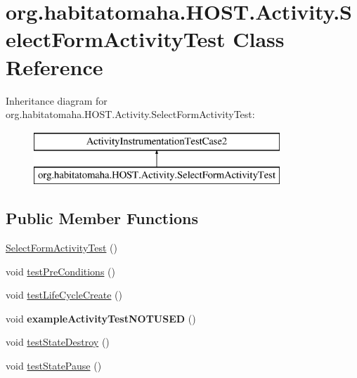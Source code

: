 \hypertarget{classorg_1_1habitatomaha_1_1_h_o_s_t_1_1_activity_1_1_select_form_activity_test}{\section{org.\-habitatomaha.\-H\-O\-S\-T.\-Activity.\-Select\-Form\-Activity\-Test Class Reference}
\label{classorg_1_1habitatomaha_1_1_h_o_s_t_1_1_activity_1_1_select_form_activity_test}
}
Inheritance diagram for org.\-habitatomaha.\-H\-O\-S\-T.\-Activity.\-Select\-Form\-Activity\-Test\-:\begin{figure}[H]
\begin{center}
\leavevmode
\includegraphics[height=2.000000cm]{classorg_1_1habitatomaha_1_1_h_o_s_t_1_1_activity_1_1_select_form_activity_test}
\end{center}
\end{figure}
\subsection*{Public Member Functions}
\begin{DoxyCompactItemize}
\item 
\hyperlink{classorg_1_1habitatomaha_1_1_h_o_s_t_1_1_activity_1_1_select_form_activity_test_a1c36d3926858cc7a01904e42834637f7}{Select\-Form\-Activity\-Test} ()
\item 
void \hyperlink{classorg_1_1habitatomaha_1_1_h_o_s_t_1_1_activity_1_1_select_form_activity_test_a754c487f825ff9eac17490d90c09cea4}{test\-Pre\-Conditions} ()
\item 
void \hyperlink{classorg_1_1habitatomaha_1_1_h_o_s_t_1_1_activity_1_1_select_form_activity_test_a7918c78326b5258573ebed55d110b2fb}{test\-Life\-Cycle\-Create} ()
\item 
\hypertarget{classorg_1_1habitatomaha_1_1_h_o_s_t_1_1_activity_1_1_select_form_activity_test_a513d12171fd97ac76bc5b6fdd797fb94}{void {\bfseries example\-Activity\-Test\-N\-O\-T\-U\-S\-E\-D} ()}\label{classorg_1_1habitatomaha_1_1_h_o_s_t_1_1_activity_1_1_select_form_activity_test_a513d12171fd97ac76bc5b6fdd797fb94}

\item 
void \hyperlink{classorg_1_1habitatomaha_1_1_h_o_s_t_1_1_activity_1_1_select_form_activity_test_ada1b61c2f7178c212f253d25f9d9abbf}{test\-State\-Destroy} ()
\item 
void \hyperlink{classorg_1_1habitatomaha_1_1_h_o_s_t_1_1_activity_1_1_select_form_activity_test_adcbd145f225f0ab38ea17bf4ae208349}{test\-State\-Pause} ()
\end{DoxyCompactItemize}
